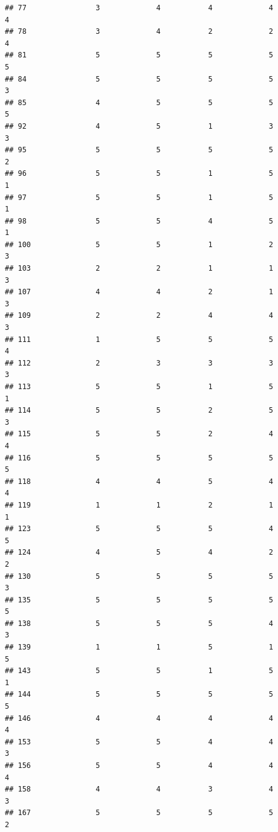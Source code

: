 \documentclass[
]{article}
\begin{document}
\begin{verbatim}
## 77                3             4           4             4            4
## 78                3             4           2             2            4
## 81                5             5           5             5            5
## 84                5             5           5             5            3
## 85                4             5           5             5            5
## 92                4             5           1             3            3
## 95                5             5           5             5            2
## 96                5             5           1             5            1
## 97                5             5           1             5            1
## 98                5             5           4             5            1
## 100               5             5           1             2            3
## 103               2             2           1             1            3
## 107               4             4           2             1            3
## 109               2             2           4             4            3
## 111               1             5           5             5            4
## 112               2             3           3             3            3
## 113               5             5           1             5            1
## 114               5             5           2             5            3
## 115               5             5           2             4            4
## 116               5             5           5             5            5
## 118               4             4           5             4            4
## 119               1             1           2             1            1
## 123               5             5           5             4            5
## 124               4             5           4             2            2
## 130               5             5           5             5            3
## 135               5             5           5             5            5
## 138               5             5           5             4            3
## 139               1             1           5             1            5
## 143               5             5           1             5            1
## 144               5             5           5             5            5
## 146               4             4           4             4            4
## 153               5             5           4             4            3
## 156               5             5           4             4            4
## 158               4             4           3             4            3
## 167               5             5           5             5            2

\end{verbatim}
\end{document}

